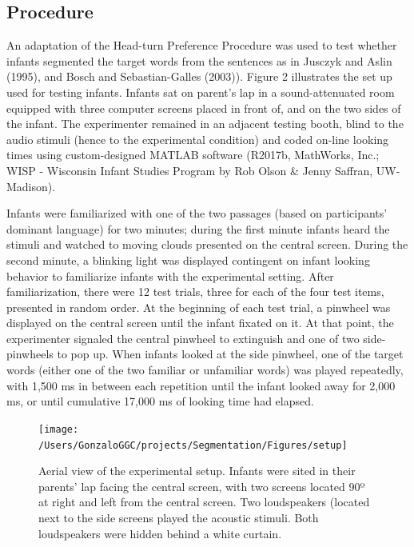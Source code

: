 \documentclass[man,floatsintext]{apa6}
\begin{document}
\hypertarget{procedure}{%
\subsection{Procedure}\label{procedure}}

An adaptation of the Head-turn Preference Procedure was used to test whether infants segmented the target words from the sentences as in Jusczyk and Aslin (1995), and Bosch and Sebastian-Galles (2003)). Figure 2 illustrates the set up used for testing infants. Infants sat on parent's lap in a sound-attenuated room equipped with three computer screens placed in front of, and on the two sides of the infant. The experimenter remained in an adjacent testing booth, blind to the audio stimuli (hence to the experimental condition) and coded on-line looking times using custom-designed MATLAB software (R2017b, MathWorks, Inc.; WISP - Wisconsin Infant Studies Program by Rob Olson \& Jenny Saffran, UW-Madison).

Infants were familiarized with one of the two passages (based on participants' dominant language) for two minutes; during the first minute infants heard the stimuli and watched to moving clouds presented on the central screen. During the second minute, a blinking light was displayed contingent on infant looking behavior to familiarize infants with the experimental setting. After familiarization, there were 12 test trials, three for each of the four test items, presented in random order. At the beginning of each test trial, a pinwheel was displayed on the central screen until the infant fixated on it. At that point, the experimenter signaled the central pinwheel to extinguish and one of two side-pinwheels to pop up. When infants looked at the side pinwheel, one of the target words (either one of the two familiar or unfamiliar words) was played repeatedly, with 1,500 ms in between each repetition until the infant looked away for 2,000 ms, or until cumulative 17,000 ms of looking time had elapsed.

\begin{figure}
\texttt{[image: /Users/GonzaloGGC/projects/Segmentation/Figures/setup]} \caption{Aerial view of the experimental setup. Infants were sited in their parents' lap facing the central screen, with two screens located 90º at right and left from the central screen. Two loudspeakers (located next to the side screens played the acoustic stimuli. Both loudspeakers were hidden behind a white curtain.}\label{fig:hpp}
\end{figure}
\end{document}
